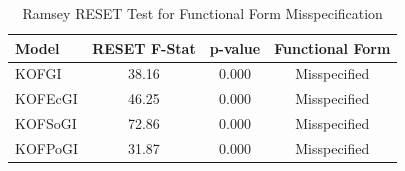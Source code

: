 \begin{table}
\caption{Ramsey RESET Test for Functional Form Misspecification}
\label{tab:reset}
\begin{tabular}{lccc}
\toprule
Model & RESET F-Stat & p-value & Functional Form \\
\midrule
KOFGI & 38.16 & 0.000 & Misspecified \\
KOFEcGI & 46.25 & 0.000 & Misspecified \\
KOFSoGI & 72.86 & 0.000 & Misspecified \\
KOFPoGI & 31.87 & 0.000 & Misspecified \\
\bottomrule
\end{tabular}
\end{table}
